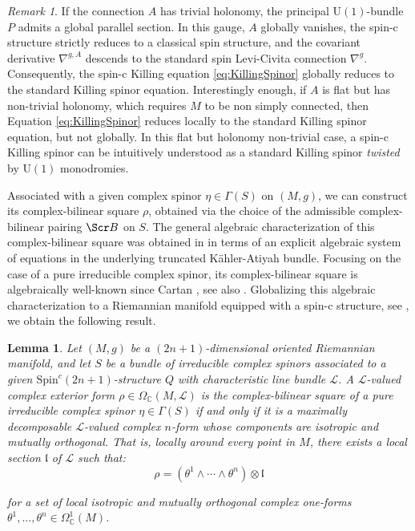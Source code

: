 \documentclass[10pt,a4paper,twoside,reqno]{amsart}
\theoremstyle{plain}
\newtheorem{lemma}[thm]{Lemma}
\theoremstyle{definition}
\theoremstyle{remark}
\newtheorem{remark}[thm]{Remark}
\def\scB{\Scr B}
\begin{document}
\begin{remark}
If the connection $A$ has trivial holonomy, the principal $\mathrm{U}(1)$-bundle $P$ admits a global parallel section. In this gauge, $A$ globally vanishes, the spin-c structure strictly reduces to a classical spin structure, and the covariant derivative $\nabla^{g,A}$ descends to the standard spin Levi-Civita connection $\nabla^g$. Consequently, the spin-c Killing equation \eqref{eq:KillingSpinor} globally reduces to the standard Killing spinor equation. Interestingly enough, if $A$ is flat but has non-trivial holonomy, which requires $M$ to be non simply connected, then Equation \eqref{eq:KillingSpinor} reduces locally to the standard Killing spinor equation, but not globally. In this flat but holonomy non-trivial case, a spin-c Killing spinor can be intuitively understood as a standard Killing spinor \emph{twisted} by $\mathrm{U}(1)$ monodromies.
\end{remark}

Associated with a given complex spinor $\eta\in \Gamma(S)$ on $(M,g)$, we can construct its complex-bilinear square $\rho$, obtained via the choice of the admissible complex-bilinear pairing $\scB$ on $S$. The general algebraic characterization of this complex-bilinear square was obtained in \cite[Thm.\ 4.12]{Algebraic_Complex_Square_2025} in terms of an explicit algebraic system of equations in the underlying truncated Kähler-Atiyah bundle. Focusing on the case of a pure irreducible complex spinor, its complex-bilinear square is algebraically well-known since Cartan \cite{Cartan1938}, see also \cite{Kopczynski1997}. Globalizing this algebraic characterization to a Riemannian manifold equipped with a spin-c structure, see \cite{Complex_Differential_Spinors_2026}, we obtain the following result.

\begin{lemma}
\label{lemma:squaresriemannian2n1}
Let $(M,g)$ be a $(2n+1)$-dimensional oriented Riemannian manifold, and let $S$ be a bundle of irreducible complex spinors associated to a given $\mathrm{Spin}^c(2n+1)$-structure $Q$ with characteristic line bundle $\mathcal{L}$. A $\mathcal{L}$-valued complex exterior form $\rho \in \Omega_{\mathbb{C}}(M,\mathcal{L})$ is the complex-bilinear square of a pure irreducible complex spinor $\eta\in\Gamma(S)$ if and only if it is a maximally decomposable $\mathcal{L}$-valued complex $n$-form whose components are isotropic and mutually orthogonal. That is, locally around every point in $M$, there exists a local section $\mathfrak{l}$ of $\mathcal{L}$ such that:
\begin{equation*}
\rho = (\theta^1\wedge \cdots \wedge \theta^n) \otimes \mathfrak{l}
\end{equation*}

\noindent
for a set of local isotropic and mutually orthogonal complex one-forms $\theta^1,\ldots,\theta^n \in \Omega^1_{\mathbb{C}}(M)$.
\end{lemma}
 
\end{document}
